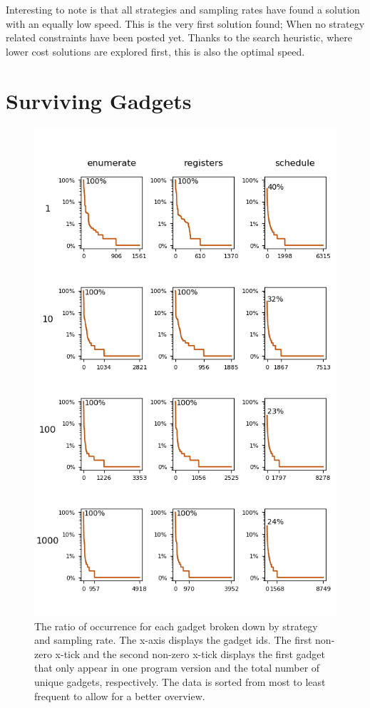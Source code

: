 Interesting to note is that all strategies and sampling rates have found a solution with
an equally low speed. This is the very first solution found; When no strategy related
constraints have been posted yet. Thanks to the search heuristic, where lower cost
solutions are explored first, this is also the optimal speed.

\section{Surviving Gadgets}

\begin{figure}[htp]
	\centering
	\includegraphics[width=\textwidth,height=\textheight]{results/figures/gadgets}
	\caption{The ratio of occurrence for each gadget broken down by strategy and sampling rate.
The x-axis displays the gadget ids. The first non-zero x-tick and the second non-zero x-tick
displays the first gadget that only appear in one program version and the total number
of unique gadgets, respectively. The data is sorted from most to least frequent to allow
for a better overview.}
	\label{fig:gadgets}
\end{figure}


